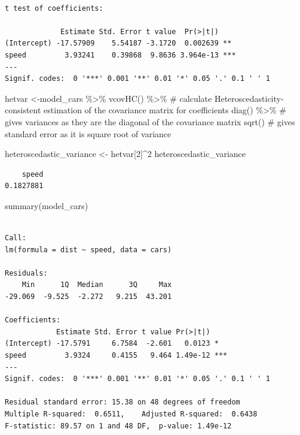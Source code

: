 \documentclass[
  letterpaper,
  DIV=11,
  numbers=noendperiod]{scrartcl}
\newenvironment{Shaded}{\begin{snugshade}}{\end{snugshade}}
\newcommand{\CommentTok}[1]{\textcolor[rgb]{0.37,0.37,0.37}{#1}}
\newcommand{\DecValTok}[1]{\textcolor[rgb]{0.68,0.00,0.00}{#1}}
\newcommand{\FunctionTok}[1]{\textcolor[rgb]{0.28,0.35,0.67}{#1}}
\newcommand{\NormalTok}[1]{\textcolor[rgb]{0.00,0.23,0.31}{#1}}
\newcommand{\OtherTok}[1]{\textcolor[rgb]{0.00,0.23,0.31}{#1}}
\newcommand{\SpecialCharTok}[1]{\textcolor[rgb]{0.37,0.37,0.37}{#1}}
\begin{document}
\begin{verbatim}

t test of coefficients:

             Estimate Std. Error t value  Pr(>|t|)    
(Intercept) -17.57909    5.54187 -3.1720  0.002639 ** 
speed         3.93241    0.39868  9.8636 3.964e-13 ***
---
Signif. codes:  0 '***' 0.001 '**' 0.01 '*' 0.05 '.' 0.1 ' ' 1
\end{verbatim}

\begin{Shaded}
\begin{Highlighting}[]
\NormalTok{hetvar }\OtherTok{\textless{}{-}}\NormalTok{model\_cars }\SpecialCharTok{\%\textgreater{}\%} 
  \FunctionTok{vcovHC}\NormalTok{() }\SpecialCharTok{\%\textgreater{}\%} \CommentTok{\# calculate Heteroscedasticity{-}consistent estimation of the covariance matrix for coefficients}
  \FunctionTok{diag}\NormalTok{() }\SpecialCharTok{\%\textgreater{}\%} \CommentTok{\# gives variances as they are the diagonal of the covariance matrix}
  \FunctionTok{sqrt}\NormalTok{() }\CommentTok{\# gives standard error as it is square root of variance}

\NormalTok{heteroscedastic\_variance }\OtherTok{\textless{}{-}}\NormalTok{ hetvar[}\DecValTok{2}\NormalTok{]}\SpecialCharTok{\^{}}\DecValTok{2}
\NormalTok{heteroscedastic\_variance}
\end{Highlighting}
\end{Shaded}

\begin{verbatim}
    speed 
0.1827881 
\end{verbatim}

\begin{Shaded}
\begin{Highlighting}[]
\FunctionTok{summary}\NormalTok{(model\_cars)}
\end{Highlighting}
\end{Shaded}

\begin{verbatim}

Call:
lm(formula = dist ~ speed, data = cars)

Residuals:
    Min      1Q  Median      3Q     Max 
-29.069  -9.525  -2.272   9.215  43.201 

Coefficients:
            Estimate Std. Error t value Pr(>|t|)    
(Intercept) -17.5791     6.7584  -2.601   0.0123 *  
speed         3.9324     0.4155   9.464 1.49e-12 ***
---
Signif. codes:  0 '***' 0.001 '**' 0.01 '*' 0.05 '.' 0.1 ' ' 1

Residual standard error: 15.38 on 48 degrees of freedom
Multiple R-squared:  0.6511,    Adjusted R-squared:  0.6438 
F-statistic: 89.57 on 1 and 48 DF,  p-value: 1.49e-12
\end{verbatim}
\end{document}
